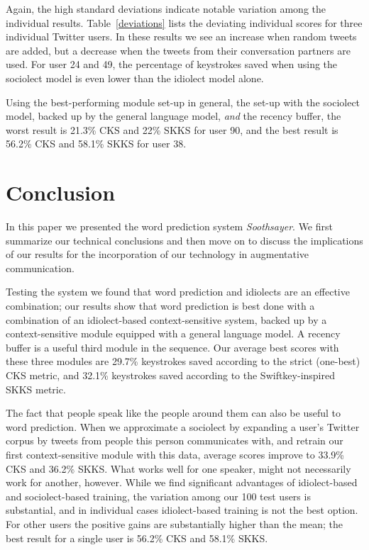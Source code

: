 \documentclass[12pt]{article}
\begin{document}
{Again, the high standard deviations indicate notable variation among the individual results. Table~\ref{deviations} lists the deviating individual scores for three individual Twitter users. In these results we see an increase when random tweets are added, but a decrease when the tweets from their conversation partners are used. For user 24 and 49, the percentage of keystrokes saved when using the sociolect model is even lower than the idiolect model alone.  

Using the best-performing module set-up in general, the set-up with the sociolect model, backed up by the general language model, \emph{and} the recency buffer, the worst result is 21.3\% CKS and 22\% SKKS for user 90, and the best result is 56.2\% CKS and 58.1\% SKKS for user 38.

\section{Conclusion} \label{conclusion}

In this paper we presented the word prediction system \emph{Soothsayer}. We first summarize our technical conclusions and then move on to discuss the implications of our results for the incorporation of our technology in augmentative communication.

Testing the system we found that word prediction and idiolects are an effective combination; our results show that word prediction is best done with a combination of an idiolect-based context-sensitive system, backed up by a context-sensitive module equipped with a general language model. A recency buffer is a useful third module in the sequence. Our average best scores with these three modules are 29.7\% keystrokes saved according to the strict (one-best) CKS metric, and 32.1\% keystrokes saved according to the Swiftkey-inspired SKKS metric. 

The fact that people speak like the people around them can also be useful to word prediction. When we approximate a sociolect by expanding a user's Twitter corpus by tweets from people this person communicates with, and retrain our first context-sensitive module with this data, average scores improve to 33.9\% CKS and 36.2\% SKKS. What works well for one speaker, might not necessarily work for another, however. While we find significant advantages of idiolect-based and sociolect-based training, the variation among our 100 test users is substantial, and in individual cases idiolect-based training is not the best option. For other users the positive gains are substantially higher than the mean; the best result for a single user is 56.2\% CKS and 58.1\% SKKS.

}
\end{document}
